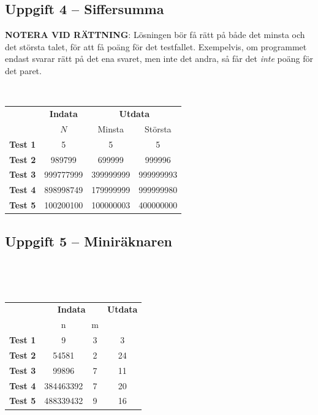 \documentclass[a4paper,12pt,oneside]{amsbook}
\theoremstyle{test}
\newcommand{\fe}[1]{\textbf{#1}}            %
\begin{document}
\subsection*{Uppgift 4 -- Siffersumma}
\textbf{NOTERA VID RÄTTNING}: Lösningen bör få rätt på både det minsta och det största talet, 
för att få poäng för det testfallet. Exempelvis, om programmet endast svarar rätt på det ena svaret, men inte det andra, så får det \textit{inte} poäng för det paret. 
~\\
{\tt 
\begin{tabular}{||l||c||c|c||}\hline\hline
& \multicolumn{1}{c||}{\fe{Indata}} & \multicolumn{2}{c||}{\fe{Utdata}} \\ 
& $N$ & Minsta & Största  \\ \hline \hline
\fe{Test 1} & 5 & 5 & 5\\ \hline
\fe{Test 2} & 989799 & 699999 & 999996 \\ \hline
\fe{Test 3} & 999777999 & 399999999 & 999999993 \\ \hline
\fe{Test 4} & 898998749 & 179999999 & 999999980 \\ \hline
\fe{Test 5} & 100200100 & 100000003 & 400000000\\ \hline\hline
\end{tabular}
}
\vspace{1cm}

\subsection*{Uppgift 5 -- Miniräknaren}
~\\
{\tt 
\begin{tabular}{||l||c|c||c||}\hline\hline
& \multicolumn{2}{c||}{\fe{Indata}} & \multicolumn{1}{c||}{\fe{Utdata}} \\ 
& n & m &  \\ \hline \hline
\fe{Test 1} & 9 & 3 & 3 \\ \hline
\fe{Test 2} & 54581 & 2 & 24 \\ \hline
\fe{Test 3} & 99896 & 7 & 11 \\ \hline
\fe{Test 4} & 384463392 & 7 & 20 \\ \hline
\fe{Test 5} & 488339432 & 9 & 16\\ \hline\hline
\end{tabular}
}
\vspace{1cm}

\newpage
\end{document}
